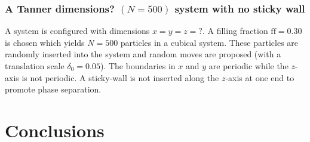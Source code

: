 \documentclass[letterpaper,twocolumn,amsmath,amssymb,pre,aps,10pt]{revtex4-1}
\newcommand{\blue}[1]{{\bf \color{blue} #1}}
\newcommand{\jpsays}[1]{{\color{red} [\blue{Jordan:} \emph{#1}]}}
\begin{document}
\subsubsection{A Tanner dimensions? $(N = 500)$ system with no sticky
wall}

A system is configured with dimensions $x = y = z = ?$.  A
filling fraction $\text{ff} = 0.30$ is chosen which yields $N = 500$
particles in a cubical system.  These particles are randomly
inserted into the system and random moves are proposed (with a
translation scale $\delta_0 = 0.05$). The boundaries in $x$ and $y$ are
periodic while the $z$-axis is not periodic.  A sticky-wall is not inserted
along the $z$-axis at one end to promote phase separation.



\section{Conclusions}



\end{document}
